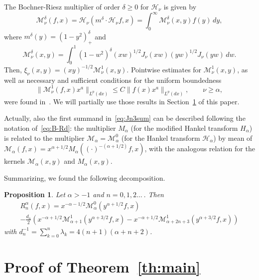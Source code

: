 \documentclass[a4paper]{amsart}
\newcommand{\calM}{\mathcal{M}}
\newcommand{\calH}{\mathcal{H}}
\newtheorem{propo}{Proposition}
\begin{document}
The Bochner-Riesz multiplier of order $\delta\ge0$ for
$\calH_\nu$ is given by
\begin{equation}
\label{eq:B-Rd}
  \calM_{\nu}^\delta(f,x)
  = \calH_\nu(m^\delta \cdot \calH_\nu f,x)
  = \int_0^\infty \calM_{\nu}^\delta(x,y)f(y)\,dy,
\end{equation}
where $m^\delta(y) = (1-y^2)^\delta_+$ and
\begin{equation}
\label{eq:KB-Rd}
  \calM^{\delta}_{\nu}(x,y)
  = \int_0^1 (1-w^2)^\delta (xw)^{1/2}J_\nu(xw)(yw)^{1/2}J_\nu(yw)\, dw.
\end{equation}
Then, $\xi_\nu(x,y) = (xy)^{-1/2}\calM^{1}_{\nu}(x,y)$.
Pointwise estimates for $\calM^{1}_{\nu}(x,y)$,
as well as necessary and sufficient conditions for the uniform boundedness
\begin{equation*}
  \|\calM_{\nu}^1(f,x)x^a\|_{L^p(dx)}
  \le C\|f(x)x^a\|_{L^p(dx)},
  \qquad \nu\ge\alpha,
\end{equation*}
were found in~\cite{CiStV}. We will partially use those results
in Section~\ref{sec:proofmain} of this paper.

Actually, also the first summand in~\eqref{eq:Jn3sum} can be described
following the notation of~\eqref{eq:B-Rd}:
the multiplier $M_\alpha$ (for the modified Hankel transform $H_{\alpha}$)
is related to the  multiplier $\calM_{\alpha} = \calM_{\alpha}^0$
(for the Hankel transform $\calH_\alpha$) by mean of
$\calM_\alpha(f,x) = x^{\alpha+1/2}M_{\alpha}((\cdot)^{-(\alpha+1/2)}f,x)$,
with the analogous relation for the kernels
$\calM_\alpha(x,y)$ and $M_{\alpha}(x,y)$.

Summarizing, we found the following decomposition.

\begin{propo}
\label{pro:3sum}
Let $\alpha>-1$ and $n=0,1,2\dots\,$. Then
\begin{multline*}
  R_n^\alpha(f,x)
  = x^{-\alpha-1/2} \calM_{\alpha}^0(y^{\alpha+1/2}f,x) \\
  - \frac{d_n}{2} \left(x^{-\alpha+1/2}
    \calM_{\alpha+1}^1(y^{\alpha+3/2}f,x)-x^{-\alpha+1/2}
    \calM_{\alpha+2n+3}^1(y^{\alpha+3/2}f,x)\right)
\end{multline*}
with $d_n^{-1} = \sum_{k=0}^n \lambda_k = 4(n+1)(\alpha+n+2)$.
\end{propo}

\section{Proof of Theorem~\ref{th:main}}
\label{sec:proofmain}
\end{document}
